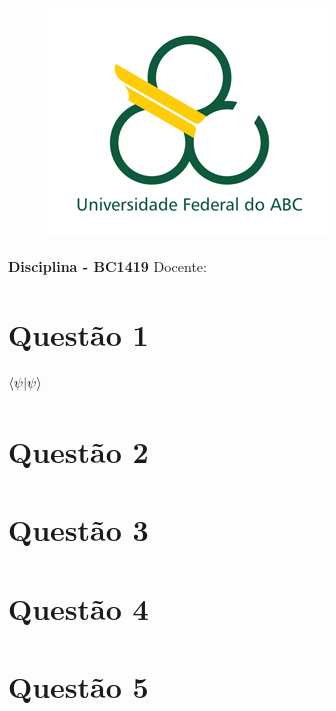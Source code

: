 \documentclass[report,12pt,openright,oneside,a4paper,brazil]{abntex2}
\date{Data}
\renewcommand{\imprimircapa}{%
\begin{capa}%
	\begin{figure}[ht]
		\centering
		\includegraphics[scale=0.6]{logo.jpg}
		\label{fig:logo}
	\end{figure}
	\begin{center}
		\textbf{\large Disciplina - BC1419}
		\vfill
    	{\LARGE\textbf{\imprimirtitulo}}
    	\vfill
    	Docente: \imprimirorientador
    	\vspace*{1cm}
		\imprimirautor
		\vfill
    	\imprimirlocal \\
    	\imprimirdata
	\end{center}
\end{capa}
}
\begin{document}
\imprimircapa


\chapter{Questão 1}

$\braket{\psi}{\psi}$

\chapter{Questão 2}

\chapter{Questão 3}

\chapter{Questão 4}

\chapter{Questão 5}
\end{document}
